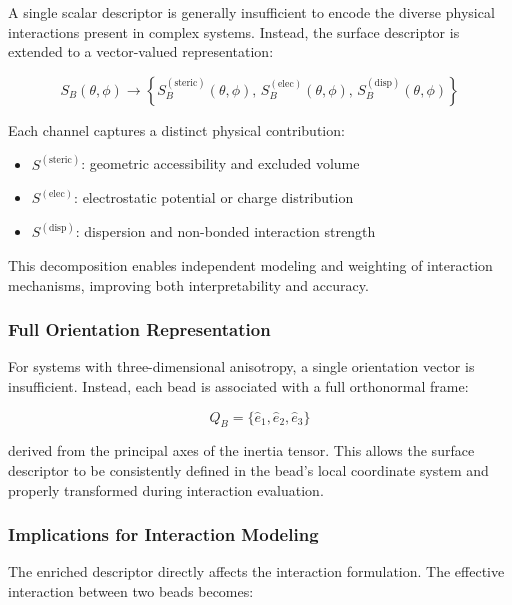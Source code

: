 \documentclass[11pt]{article}
\begin{document}
A single scalar descriptor is generally insufficient to encode the diverse physical interactions present in complex systems. Instead, the surface descriptor is extended to a vector-valued representation:

\begin{equation}
S_B(\theta,\phi) \rightarrow
\left\{
S_B^{(\text{steric})}(\theta,\phi),\,
S_B^{(\text{elec})}(\theta,\phi),\,
S_B^{(\text{disp})}(\theta,\phi)
\right\}
\end{equation}

Each channel captures a distinct physical contribution:

\begin{itemize}
    \item $S^{(\text{steric})}$: geometric accessibility and excluded volume
    \item $S^{(\text{elec})}$: electrostatic potential or charge distribution
    \item $S^{(\text{disp})}$: dispersion and non-bonded interaction strength
\end{itemize}

This decomposition enables independent modeling and weighting of interaction mechanisms, improving both interpretability and accuracy.

\subsubsection{Full Orientation Representation}

For systems with three-dimensional anisotropy, a single orientation vector is insufficient. Instead, each bead is associated with a full orthonormal frame:

\begin{equation}
Q_B = \{\hat{e}_1, \hat{e}_2, \hat{e}_3\}
\end{equation}

derived from the principal axes of the inertia tensor. This allows the surface descriptor to be consistently defined in the bead's local coordinate system and properly transformed during interaction evaluation.

\subsubsection{Implications for Interaction Modeling}

The enriched descriptor directly affects the interaction formulation. The effective interaction between two beads becomes:
\end{document}
